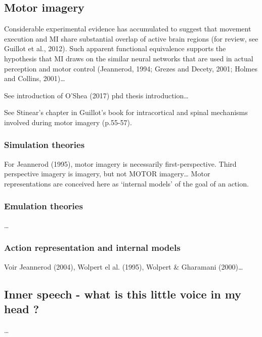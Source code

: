 \documentclass[a4paper,12pt,oneside,oldfontcommands]{memoir}
\begin{document}
\subsection{Motor imagery}\label{motor-imagery}

Considerable experimental evidence has accumulated to suggest that
movement execution and MI share substantial overlap of active brain
regions (for review, see Guillot et al., 2012). Such apparent functional
equivalence supports the hypothesis that MI draws on the similar neural
networks that are used in actual perception and motor control
(Jeannerod, 1994; Grezes and Decety, 2001; Holmes and Collins,
2001)\ldots{}

See introduction of O'Shea (2017) phd thesis introduction\ldots{}

See Stinear's chapter in Guillot's book for intracortical and spinal
mechanisms involved during motor imagery (p.55-57).

\subsubsection{Simulation theories}\label{simulation-theories}

For Jeannerod (1995), motor imagery is necessarily first-perspective.
Third perspective imagery is imagery, but not MOTOR imagery\ldots{}
Motor representations are conceived here as `internal models' of the
goal of an action.

\subsubsection{Emulation theories}\label{emulation-theories}

\ldots{}

\subsubsection{Action representation and internal
models}\label{action-representation-and-internal-models}

Voir Jeannerod (2004), Wolpert el al. (1995), Wolpert \& Gharamani
(2000)\ldots{}

\subsection{Inner speech - what is this little voice in my head
?}\label{inner-speech---what-is-this-little-voice-in-my-head}

\ldots{}
\end{document}
